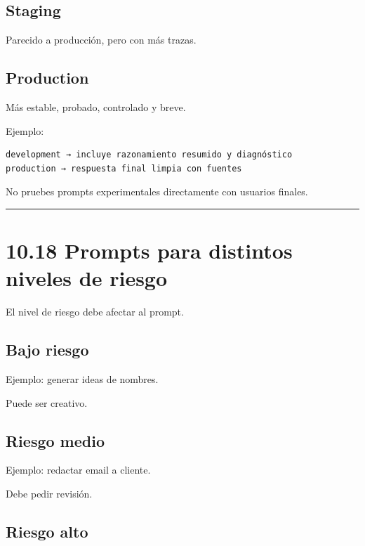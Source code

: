 \subsection{Staging}\label{staging}

Parecido a producción, pero con más trazas.

\subsection{Production}\label{production}

Más estable, probado, controlado y breve.

Ejemplo:

\begin{lstlisting}
development → incluye razonamiento resumido y diagnóstico
production → respuesta final limpia con fuentes
\end{lstlisting}

No pruebes prompts experimentales directamente con usuarios finales.

\begin{center}\rule{0.5\linewidth}{0.5pt}\end{center}

\section{10.18 Prompts para distintos niveles de
riesgo}\label{prompts-para-distintos-niveles-de-riesgo}

El nivel de riesgo debe afectar al prompt.

\subsection{Bajo riesgo}\label{bajo-riesgo}

Ejemplo: generar ideas de nombres.

Puede ser creativo.

\subsection{Riesgo medio}\label{riesgo-medio}

Ejemplo: redactar email a cliente.

Debe pedir revisión.

\subsection{Riesgo alto}\label{riesgo-alto}

